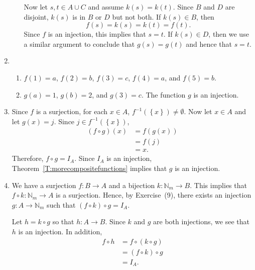 \begin{enumerate}
\begin{enumerate}
Now let $s, t \in A \cup C$ and assume $k \left( s \right) = k \left( t \right)$.  Since $B$ and 
$D$ are disjoint, $k \left( s \right)$ is in $B$ or $D$ but not both.  If 
$k \left( s \right) \in B$, then
\[
f \left( s \right) = k \left( s \right) = k \left( t \right) = f \left( t \right).
\]
Since $f$ is an injection, this implies that $s = t$.  If $k \left( s \right) \in D$, then we use a similar argument to conclude that $g \left( s \right) = g \left( t \right)$ and hence that 
$s = t$.
\end{enumerate}

\item \begin{enumerate}
\item $f \left( 1 \right) = a$, $f \left( 2 \right) = b$, $f \left( 3 \right) = c$, 
$f \left( 4 \right) = a$, and $f \left( 5 \right) = b$.

\item $g \left( a \right) = 1$, $g \left( b \right) = 2$, and $g \left( 3 \right) = c$.  The function $g$ is an injection.
\end{enumerate}

\item Since $f$ is a surjection, for each $x \in A$, 
$f^{-1} \left( \left\{ x \right\} \right) \ne \emptyset$.  Now let $x \in A$ and let 
$g \left( x \right) = j$.  Since $j \in f^{-1} \left( \left\{ x \right\} \right)$,
\[
\begin{aligned}
\left( f \circ g \right) \left( x \right) &= f \left( g \left( x \right) \right) \\
                                          &= f \left( j \right) \\
                                          &= x.
\end{aligned}
\]
Therefore, $f \circ g = I_A$.  Since $I_A$ is an injection, Theorem~\ref{T:morecompositefunctions} implies that $g$ is an injection.

\item We have a surjection $f: B \to A$  and a bijection $k: \mathbb{N}_m \to B$.  This implies that $f \circ k: \mathbb{N}_m \to A$ is a surjection.  Hence, by Exercise~(9), there exists an injection $g: A \to \mathbb{N}_m$ such that $\left( f \circ k \right) \circ g = I_A$.

Let $h = k \circ g$ so that $h: A \to B$.  Since $k$ and $g$ are both injections, we see that $h$ is an injection.  In addition,
\[
\begin{aligned}
f \circ h &= f \circ \left( k \circ g \right) \\
          &= \left( f \circ k \right) \circ g \\
          &= I_A.
\end{aligned}
\]
\hbreak


\end{enumerate}


\endinput

